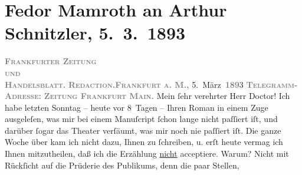 

               \section[Fedor Mamroth an Arthur Schnitzler, 5. 3. 1893]{ Fedor Mamroth an Arthur Schnitzler, 5. 3. 1893}\nopagebreak{}\rehead{ }\begin{ledgroupsized}[t]{13cm}\normalsize\beginnumbering{} \toendnotes[C]{\smallbreak\pagebreak[2]} 
\toendnotes[C]{\smallbreak}\pstart
           \noindent{}{\pb}\textcolor{gray}{\textbf{\textsc{Frankfurter Zeitung}}}{\\}\textsc{\textcolor{gray}{\textbf{und}}}{\\}\textcolor{gray}{\textbf{\textsc{Handelsblatt.}}}\pend
           \pstart
           \textcolor{gray}{\textbf{\textsc{Redaction.}}}\hfill \textcolor{gray}{\textbf{\textsc{Frankfurt a. M.,}}}{ }5. März \textsc{\textcolor{gray}{\textbf{189}}}3\pend
           \pstart
           \textcolor{gray}{\textbf{\textsc{Telegramm-Adresse:}}}\pend
           \pstart
           \textcolor{gray}{\textbf{\textsc{Zeitung Frankfurt Main.}}}\pend
           \pstart{}Mein ſehr verehrter Herr Doctor!\pend\pstart
           Ich habe letzten Sonntag – heute vor 8 Tagen – Ihren Roman in einem Zuge ausgeleſen, was mir bei einem
                    Manuſcript ſchon lange nicht paſſiert iſt, und darüber ſogar das Theater
                    verſäumt, was mir noch nie paſſiert iſt. Die ganze Woche über kam ich nicht
                    dazu, Ihnen zu ſchreiben, u. erſt heute vermag ich Ihnen mitzutheilen, daß ich
                    die Erzählung \uline{nicht} acceptiere.\pend
           \pstart
           Warum? Nicht mit Rückſicht auf die Prüderie des Publikums, denn die paar Stellen,

\end{ledgroupsized}
